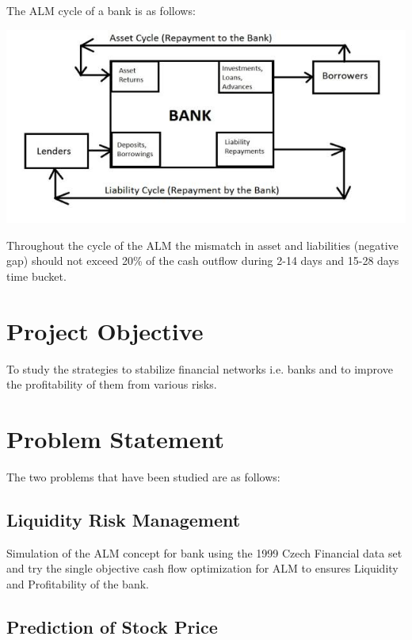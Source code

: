 		The ALM cycle of a bank is as follows:

		\begin{center}
		\includegraphics[width=\linewidth]{figures/ALM_Cycle_of_a_Bank.jpg}	
		\label{fig:ALM Cycle of a Bank}
		\end{center}

		Throughout the cycle of the ALM the mismatch in asset and liabilities (negative gap) should not exceed 20\% of the cash outflow during 2-14 days and 15-28 days time bucket.

	
\section{Project Objective}

	To study the strategies to stabilize financial networks i.e. banks and to improve the profitability of them from various risks. 

\section{Problem Statement}

	The two problems that have been studied are as follows:
	\subsection{Liquidity Risk Management}

Simulation of the ALM concept for bank using the 1999 Czech Financial data set and try the single objective cash flow optimization for ALM to ensures Liquidity and Profitability of the bank. 

	\subsection{Prediction of Stock Price}

